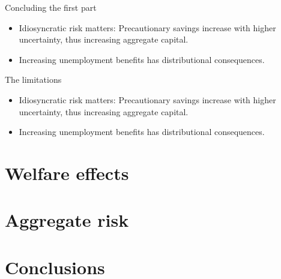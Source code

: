 \documentclass{beamer}
\begin{document}
\begin{frame}{Concluding the first part}
	
	\begin{itemize}
	
	\item {
Idiosyncratic risk matters: 
Precautionary savings increase with higher uncertainty, thus increasing aggregate capital. 
	}	
	\item {
Increasing unemployment benefits has distributional consequences. 
	}	

	\end{itemize} 
\end{frame}

\begin{frame}{The limitations}
	
	\begin{itemize}
	
	\item {
Idiosyncratic risk matters: 
Precautionary savings increase with higher uncertainty, thus increasing aggregate capital. 
	}	
	\item {
Increasing unemployment benefits has distributional consequences. 
	}	

	\end{itemize} 
\end{frame}


\section{Welfare effects}
\subsection{}


\section{Aggregate risk}
\subsection{}

\section{Conclusions}
\subsection{}
\end{document}
